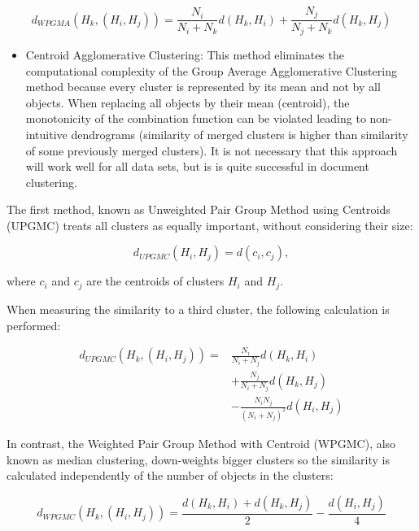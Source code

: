 \documentclass[10pt]{book}
\begin{document}
\begin{equation*}
d_{W P G M A}\left(H_{k},\left(H_{i}, H_{j}\right)\right)=\frac{N_{i}}{N_{i}+N_{k}} d\left(H_{k}, H_{i}\right)+\frac{N_{j}}{N_{j}+N_{k}} d\left(H_{k}, H_{j}\right) \tag{12.31}
\end{equation*}


\begin{itemize}
  \item Centroid Agglomerative Clustering: This method eliminates the computational complexity of the Group Average Agglomerative Clustering method because every cluster is represented by its mean and not by all objects. When replacing all objects by their mean (centroid), the monotonicity of the combination function can be violated leading to non-intuitive dendrograms (similarity of merged clusters is higher than similarity of some previously merged clusters). It is not necessary that this approach will work well for all data sets, but is is quite successful in document clustering.
\end{itemize}

The first method, known as Unweighted Pair Group Method using Centroids (UPGMC) treats all clusters as equally important, without considering their size:


\begin{equation*}
d_{U P G M C}\left(H_{i}, H_{j}\right)=d\left(c_{i}, c_{j}\right), \tag{12.32}
\end{equation*}


where $c_{i}$ and $c_{j}$ are the centroids of clusters $H_{i}$ and $H_{j}$.

When measuring the similarity to a third cluster, the following calculation is performed:


\begin{align*}
d_{U P G M C}\left(H_{k},\left(H_{i}, H_{j}\right)\right)= & \frac{N_{i}}{N_{i}+N_{j}} d\left(H_{k}, H_{i}\right) \\
& +\frac{N_{j}}{N_{i}+N_{j}} d\left(H_{k}, H_{j}\right)  \tag{12.33}\\
& -\frac{N_{i} N_{j}}{\left(N_{i}+N_{j}\right)^{2}} d\left(H_{i}, H_{j}\right)
\end{align*}


In contrast, the Weighted Pair Group Method with Centroid (WPGMC), also known as median clustering, down-weights bigger clusters so the similarity is calculated independently of the number of objects in the clusters:


\begin{equation*}
d_{W P G M C}\left(H_{k},\left(H_{i}, H_{j}\right)\right)=\frac{d\left(H_{k}, H_{i}\right)+d\left(H_{k}, H_{j}\right)}{2}-\frac{d\left(H_{i}, H_{j}\right)}{4} \tag{12.34}
\end{equation*}
\end{document}
